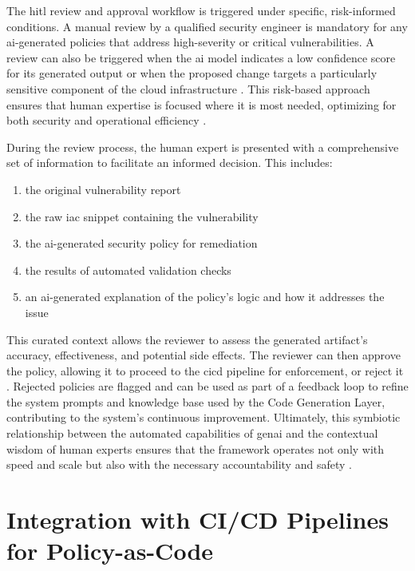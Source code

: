 The \gls{hitl} review and approval workflow is triggered under specific, risk-informed conditions. A manual review by a qualified security engineer is mandatory for any \gls{ai}-generated policies that address high-severity or critical vulnerabilities. A review can also be triggered when the \gls{ai} model indicates a low confidence score for its generated output or when the proposed change targets a particularly sensitive component of the cloud infrastructure \cite{nicosia_risk_nodate}. This risk-based approach ensures that human expertise is focused where it is most needed, optimizing for both security and operational efficiency \cite{noauthor_human---loop_nodate}.

During the review process, the human expert is presented with a comprehensive set of information to facilitate an informed decision. This includes:
\begin{enumerate}
    \item the original vulnerability report
    \item the raw \gls{iac} snippet containing the vulnerability
    \item the \gls{ai}-generated security policy for remediation
    \item the results of automated validation checks
    \item an \gls{ai}-generated explanation of the policy’s logic and how it addresses the issue
\end{enumerate}

This curated context allows the reviewer to assess the generated artifact's accuracy, effectiveness, and potential side effects. The reviewer can then approve the policy, allowing it to proceed to the \gls{cicd} pipeline for enforcement, or reject it \cite{noauthor_human---loop_nodate}. Rejected policies are flagged and can be used as part of a feedback loop to refine the system prompts and knowledge base used by the Code Generation Layer, contributing to the system's continuous improvement. Ultimately, this symbiotic relationship between the automated capabilities of \gls{genai} and the contextual wisdom of human experts ensures that the framework operates not only with speed and scale but also with the necessary accountability and safety  \cite{noauthor_human---loop_nodate}.


\section{Integration with CI/CD Pipelines for Policy-as-Code} %
\label{sec:Integration with CI/CD Pipelines for Policy-as-Code}

